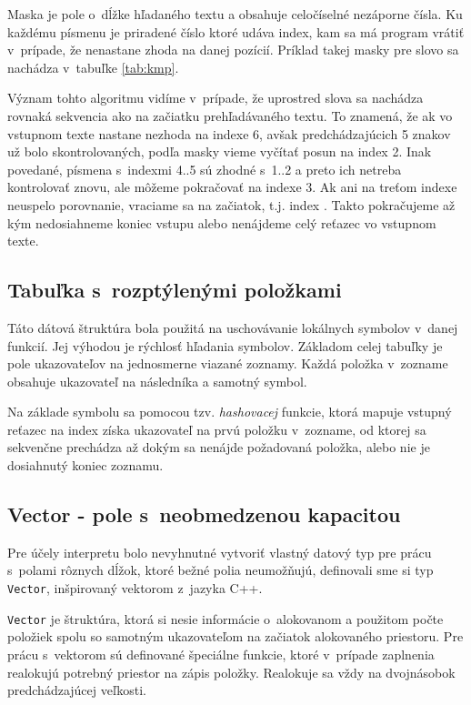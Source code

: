 \documentclass[12pt,a4paper,titlepage,final]{article}
\begin{document}
Maska je pole o~dĺžke hľadaného textu a obsahuje celočíselné nezáporne čísla.
Ku každému písmenu je priradené číslo ktoré udáva index, kam sa má program
 vrátiť v~prípade, že nenastane zhoda na danej pozícií. Príklad takej masky
 pre slovo  sa nachádza v~tabuľke \ref{tab:kmp}.

Význam tohto algoritmu vidíme v~prípade, že uprostred slova sa nachádza
 rovnaká sekvencia ako na začiatku prehľadávaného textu.
To znamená, že ak vo vstupnom texte nastane nezhoda na indexe 6, avšak
 predchádzajúcich 5 znakov už bolo skontrolovaných, podľa masky vieme vyčítať
 posun na index 2. Inak povedané, písmena s~indexmi 4..5 sú zhodné s~1..2
 a preto ich netreba kontrolovať znovu, ale môžeme pokračovať na indexe 3.
Ak ani na treťom indexe neuspelo porovnanie, vraciame sa na začiatok, t.j.
index . Takto pokračujeme až kým nedosiahneme koniec vstupu alebo
nenájdeme celý reťazec vo vstupnom texte.

\subsection{Tabuľka s~rozptýlenými položkami}
Táto dátová štruktúra bola použitá na uschovávanie lokálnych symbolov v~danej
 funkcií. Jej výhodou je rýchlosť hľadania symbolov. 
Základom celej tabuľky je pole ukazovateľov na jednosmerne viazané zoznamy.
Každá položka v~zozname obsahuje ukazovateľ na následníka a samotný symbol.

Na základe symbolu sa pomocou tzv. \emph{hashovacej} funkcie, 
 ktorá mapuje vstupný reťazec na index získa ukazovateľ na prvú položku
 v~zozname, od ktorej sa sekvenčne prechádza až dokým sa nenájde požadovaná
 položka, alebo nie je dosiahnutý koniec zoznamu.
 
\subsection{Vector - pole s~neobmedzenou kapacitou}
Pre účely interpretu bolo nevyhnutné vytvoriť vlastný datový typ pre prácu
s~polami rôznych dĺžok, ktoré bežné polia neumožňujú, definovali sme si
typ \texttt{Vector}, inšpirovaný vektorom z~jazyka C++. 

\texttt{Vector} je štruktúra, ktorá si nesie informácie o~alokovanom a použitom 
počte položiek spolu so samotným ukazovateľom na začiatok alokovaného priestoru. 
Pre prácu s~vektorom sú definované špeciálne funkcie, ktoré v~prípade zaplnenia
realokujú potrebný priestor na zápis položky. Realokuje sa vždy na dvojnásobok
predchádzajúcej veľkosti.
\end{document}
